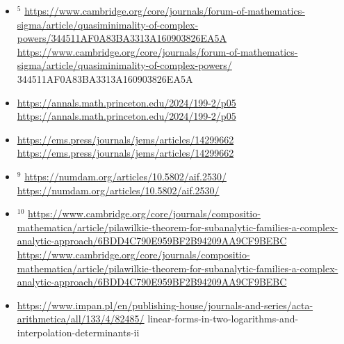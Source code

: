 \documentclass[10pt]{article}
\begin{document}
\begin{itemize}
  \item[] ${ }^{5}$ \href{https://www.cambridge.org/core/journals/forum-of-mathematics-sigma/article/quasiminimality-of-complex-powers/344511AF0A83BA3313A160903826EA5A}{https://www.cambridge.org/core/journals/forum-of-mathematics-sigma/article/quasiminimality-of-complex-powers/344511AF0A83BA3313A160903826EA5A}\\
\href{https://www.cambridge.org/core/journals/forum-of-mathematics-sigma/article/quasiminimality-of-complex-powers/}{https://www.cambridge.org/core/journals/forum-of-mathematics-sigma/article/quasiminimality-of-complex-powers/} 344511AF0A83BA3313A160903826EA5A
  \item[7] \href{https://annals.math.princeton.edu/2024/199-2/p05}{https://annals.math.princeton.edu/2024/199-2/p05}\\
\href{https://annals.math.princeton.edu/2024/199-2/p05}{https://annals.math.princeton.edu/2024/199-2/p05}
  \item[8] \href{https://ems.press/journals/jems/articles/14299662}{https://ems.press/journals/jems/articles/14299662}\\
\href{https://ems.press/journals/jems/articles/14299662}{https://ems.press/journals/jems/articles/14299662}
  \item[] ${ }^{9}$ \href{https://numdam.org/articles/10.5802/aif.2530/}{https://numdam.org/articles/10.5802/aif.2530/}\\
\href{https://numdam.org/articles/10.5802/aif.2530/}{https://numdam.org/articles/10.5802/aif.2530/}
  \item[] ${ }^{10}$ \href{https://www.cambridge.org/core/journals/compositio-mathematica/article/pilawilkie-theorem-for-subanalytic-families-a-complex-analytic-approach/6BDD4C790E959BF2B94209AA9CF9BEBC}{https://www.cambridge.org/core/journals/compositio-mathematica/article/pilawilkie-theorem-for-subanalytic-families-a-complex-analytic-approach/6BDD4C790E959BF2B94209AA9CF9BEBC}\\
\href{https://www.cambridge.org/core/journals/compositio-mathematica/article/pilawilkie-theorem-for-subanalytic-families-a-complex-analytic-approach/6BDD4C790E959BF2B94209AA9CF9BEBC}{https://www.cambridge.org/core/journals/compositio-mathematica/article/pilawilkie-theorem-for-subanalytic-families-a-complex-analytic-approach/6BDD4C790E959BF2B94209AA9CF9BEBC}
  \item[1235] \href{https://www.impan.pl/en/publishing-house/journals-and-series/acta-arithmetica/all/133/4/82485/}{https://www.impan.pl/en/publishing-house/journals-and-series/acta-arithmetica/all/133/4/82485/} linear-forms-in-two-logarithms-and-interpolation-determinants-ii\\

\end{itemize}
\end{document}
